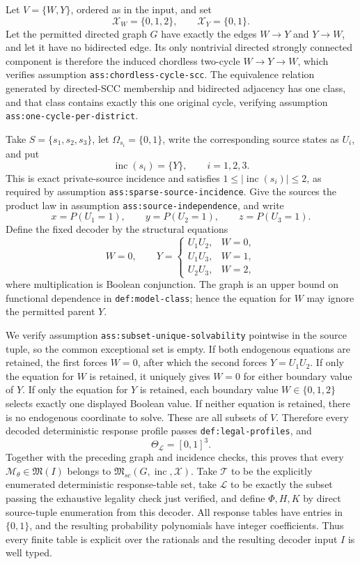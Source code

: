 Let \(V=\{W,Y\}\), ordered as in the input, and set
\[
 \mathcal X_W=\{0,1,2\},\qquad \mathcal X_Y=\{0,1\}.
\]
Let the permitted directed graph \(G\) have exactly the edges \(W\to Y\) and \(Y\to W\), and let it have no bidirected edge.  Its only nontrivial directed strongly connected component is therefore the induced chordless two-cycle \(W\to Y\to W\), which verifies assumption \texttt{ass:chordless-cycle-scc}.  The equivalence relation generated by directed-SCC membership and bidirected adjacency has one class, and that class contains exactly this one original cycle, verifying assumption \texttt{ass:one-cycle-per-district}.

Take \(S=\{s_1,s_2,s_3\}\), let \(\Omega_{s_i}=\{0,1\}\), write the corresponding source states as \(U_i\), and put
\[
 \operatorname{inc}(s_i)=\{Y\},\qquad i=1,2,3.
\]
This is exact private-source incidence and satisfies \(1\leq |\operatorname{inc}(s_i)|\leq2\), as required by assumption \texttt{ass:sparse-source-incidence}.  Give the sources the product law in assumption \texttt{ass:source-independence}, and write
\[
 x=P(U_1=1),\qquad y=P(U_2=1),\qquad z=P(U_3=1).
\]
Define the fixed decoder by the structural equations
\[
 W=0,
 \qquad
 Y=
 \begin{cases}
 U_1U_2,&W=0,\\
 U_1U_3,&W=1,\\
 U_2U_3,&W=2,
 \end{cases}
\]
where multiplication is Boolean conjunction.  The graph is an upper bound on functional dependence in \texttt{def:model-class}; hence the equation for \(W\) may ignore the permitted parent \(Y\).

We verify assumption \texttt{ass:subset-unique-solvability} pointwise in the source tuple, so the common exceptional set is empty.  If both endogenous equations are retained, the first forces \(W=0\), after which the second forces \(Y=U_1U_2\).  If only the equation for \(W\) is retained, it uniquely gives \(W=0\) for either boundary value of \(Y\).  If only the equation for \(Y\) is retained, each boundary value \(W\in\{0,1,2\}\) selects exactly one displayed Boolean value.  If neither equation is retained, there is no endogenous coordinate to solve.  These are all subsets of \(V\).  Therefore every decoded deterministic response profile passes \texttt{def:legal-profiles}, and
\[
 \Theta_{\mathcal L}=[0,1]^3.
\]
Together with the preceding graph and incidence checks, this proves that every \(\mathcal M_\theta\in\mathfrak M(I)\) belongs to \(\mathfrak M_{sc}(G,\operatorname{inc},\mathcal X)\).  Take \(\mathcal T\) to be the explicitly enumerated deterministic response-table set, take \(\mathcal L\) to be exactly the subset passing the exhaustive legality check just verified, and define \(\Phi,H,K\) by direct source-tuple enumeration from this decoder.  All response tables have entries in \(\{0,1\}\), and the resulting probability polynomials have integer coefficients.  Thus every finite table is explicit over the rationals and the resulting decoder input \(I\) is well typed.

